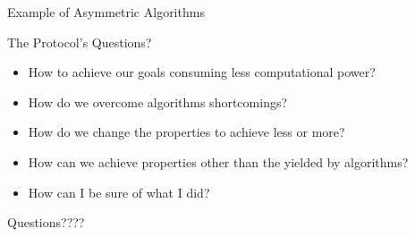 \documentclass[12pt,table,xcolor={dvipsnames}]{beamer}
\begin{document}
\begin{frame}{Example of Asymmetric Algorithms}
\end{frame}

\begin{frame}{The Protocol's Questions?}
\begin{itemize}
\item How to achieve our goals consuming less computational power?\pause
\item How do we overcome algorithms shortcomings? \pause
\item How do we change the properties to achieve less or more?\pause
\item How can we achieve properties other than the yielded by algorithms?\pause
\item How can I be sure of what I did?
\end{itemize}
\end{frame}

{
\begin{frame}

{\LARGE Questions????}

\end{frame}
}
\end{document}

